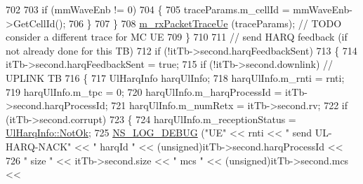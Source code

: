 \begin{DoxyCode}
702 
703                                                 \textcolor{keywordflow}{if} (mmWaveEnb != 0)
704                                                 \{
705                                                         traceParams.m\_cellId = mmWaveEnb->GetCellId();  
706                                                 \} 
707                                         \}
708                                         \hyperlink{classns3_1_1MmWaveSpectrumPhy_a9a0b7373bd200aebda3532c70e74e81d}{m\_rxPacketTraceUe} (traceParams); \textcolor{comment}{// TODO consider
       a different trace for MC UE}
709                                 \}
710 
711                                 \textcolor{comment}{// send HARQ feedback (if not already done for this TB)}
712                                 \textcolor{keywordflow}{if} (!itTb->second.harqFeedbackSent)
713                                 \{
714                                         itTb->second.harqFeedbackSent = \textcolor{keyword}{true};
715                                         \textcolor{keywordflow}{if} (!itTb->second.downlink)  \textcolor{comment}{// UPLINK TB}
716                                         \{
717                                                 UlHarqInfo harqUlInfo;
718                                                 harqUlInfo.m\_rnti = rnti;
719                                                 harqUlInfo.m\_tpc = 0;
720                                                 harqUlInfo.m\_harqProcessId = itTb->second.harqProcessId;
721                                                 harqUlInfo.m\_numRetx = itTb->second.rv;
722                                                 \textcolor{keywordflow}{if} (itTb->second.corrupt)
723                                                 \{
724                                                         harqUlInfo.m\_receptionStatus = 
      \hyperlink{structns3_1_1UlHarqInfo_af1ea9a1ce02c9b4a551ac978484a4336a488db5f30de0c73647fed90c4a994a83}{UlHarqInfo::NotOk};
725                                                         \hyperlink{group__logging_ga413f1886406d49f59a6a0a89b77b4d0a}{NS\_LOG\_DEBUG} (\textcolor{stringliteral}{"UE"} << rnti << \textcolor{stringliteral}{" send
       UL-HARQ-NACK"} << \textcolor{stringliteral}{" harqId "} << (\textcolor{keywordtype}{unsigned})itTb->second.harqProcessId <<
726                                                                                                                 \textcolor{stringliteral}{
      " size "} << itTb->second.size << \textcolor{stringliteral}{" mcs "} << (\textcolor{keywordtype}{unsigned})itTb->second.mcs <<

\end{DoxyCode}
